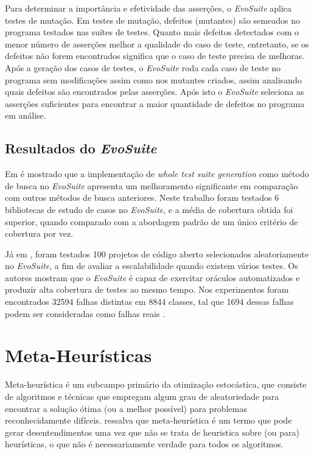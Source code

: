 \documentclass[conference]{IEEEtran}
\begin{document}
Para determinar a importância e efetividade das asserções, o \textit{EvoSuite} aplica testes de mutação. Em testes de mutação, defeitos (mutantes) são semeados no programa testados nas suítes de testes. Quanto mais defeitos detectados com o menor número de asserções melhor a qualidade do caso de teste, entretanto, se os defeitos não forem encontrados significa que o caso de teste precisa de melhoras. Após a geração dos casos de testes, o \textit{EvoSuite} roda cada caso de teste no programa sem modificações assim como nos mutantes criados, assim analisando quais defeitos são encontrados pelas asserções. Após isto o \textit{EvoSuite} seleciona as asserções suficientes para encontrar a maior quantidade de defeitos no programa em análise.

\subsection{Resultados do \textit{EvoSuite}}

Em \cite{fraser2011evosuite} é mostrado que a implementação de \textit{whole test suite generation} como método de busca no \textit{EvoSuite} apresenta um melhoramento significante em comparação com outros métodos de busca anteriores. Neste trabalho foram testados 6 bibliotecas de estudo de casos no \textit{EvoSuite}, e a média de cobertura obtida foi superior, quando comparado com a abordagem padrão de um único critério de cobertura por vez.

Já em \cite{fraser20151600}, foram testados 100 projetos de código aberto selecionados aleatoriamente no \textit{EvoSuite}, a fim de avaliar a escalabilidade quando existem vários testes. Os autores mostram que o \textit{EvoSuite} é capaz de exercitar oráculos automatizados e produzir alta cobertura de testes ao mesmo tempo. Nos experimentos foram encontrados 32594 falhas distintas em 8844 classes, tal que 1694 dessas falhas podem ser consideradas como falhas reais \cite{fraser20151600}.


\newpage

\section{Meta-Heurísticas} \label{MetaHeuristicas}

Meta-heurística é um subcampo primário da otimização estocástica, que consiste de algoritmos e técnicas que empregam algum grau de aleatoriedade para encontrar a solução ótima (ou a melhor possível) para problemas reconhecidamente difíceis. \cite{luke2009essentials} \cite{luke2009essentials} ressalva que meta-heurística é um termo que pode gerar desentendimentos
uma vez que não se trata de heuristica sobre (ou para) heurísticas, o que não é necessariamente verdade para todos os algoritmos.  
\end{document}
